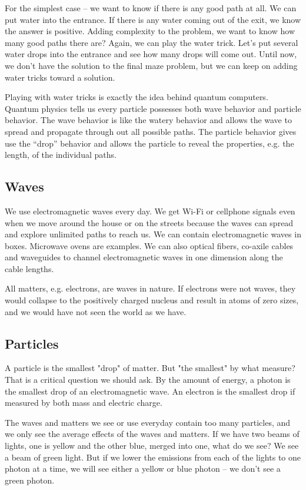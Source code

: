 \documentclass{book}
\begin{document}
For the simplest case – we want to know if there is any good path at all. We can put water into the entrance. If there is any water coming out of the exit, we know the answer is positive. Adding complexity to the problem, we want to know how many good paths there are? Again, we can play the water trick. Let’s put several water drops into the entrance and see how many drops will come out. Until now, we don't have the solution to the final maze problem, but we can keep on adding water tricks toward a solution.

Playing with water tricks is exactly the idea behind quantum computers. Quantum physics tells us every particle possesses both wave behavior and particle behavior. The wave behavior is like the watery behavior and allows the wave to spread and propagate through out all possible paths. The particle behavior gives use the “drop” behavior and allows the particle to reveal the properties, e.g. the length, of the individual paths.
\subsection{Waves}
We use electromagnetic waves every day. We get Wi-Fi or cellphone signals even when we move around the house or on the streets because the waves can spread and explore unlimited paths to reach us. We can contain electromagnetic waves in boxes. Microwave ovens are examples. We can also optical fibers, co-axile cables and waveguides to channel electromagnetic waves in one dimension along the cable lengths.

All matters, e.g. electrons, are waves in nature. If electrons were not waves, they would collapse to the positively charged nucleus and result in atoms of zero sizes, and we would have not seen the world as we have.

\subsection{Particles}
A particle is the smallest "drop" of matter. But "the smallest" by what measure? That is a critical question we should ask. By the amount of energy, a photon is the smallest drop of an electromagnetic wave. An electron is the smallest drop if measured by both mass and electric charge.

The waves and matters we see or use everyday contain too many particles, and we only see the average effects of the waves and matters. If we have two beams of lights, one is yellow and the other blue, merged into one, what do we see? We see a beam of green light. But if we lower the emissions from each of the lights to one photon at a time, we will see either a yellow or blue photon -- we don't see a green photon. 
\end{document}
